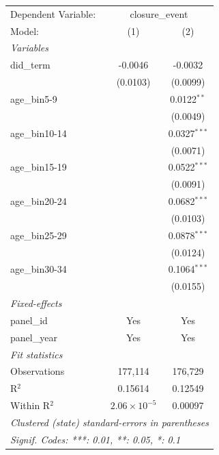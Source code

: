
\begingroup
\centering
\begin{tabular}{lcc}
   \tabularnewline \midrule \midrule
   Dependent Variable: & \multicolumn{2}{c}{closure\_event}\\
   Model:         & (1)                   & (2)\\  
   \midrule
   \emph{Variables}\\
   did\_term      & -0.0046               & -0.0032\\   
                  & (0.0103)              & (0.0099)\\   
   age\_bin5-9    &                       & 0.0122$^{**}$\\   
                  &                       & (0.0049)\\   
   age\_bin10-14  &                       & 0.0327$^{***}$\\   
                  &                       & (0.0071)\\   
   age\_bin15-19  &                       & 0.0522$^{***}$\\   
                  &                       & (0.0091)\\   
   age\_bin20-24  &                       & 0.0682$^{***}$\\   
                  &                       & (0.0103)\\   
   age\_bin25-29  &                       & 0.0878$^{***}$\\   
                  &                       & (0.0124)\\   
   age\_bin30-34  &                       & 0.1064$^{***}$\\   
                  &                       & (0.0155)\\   
   \midrule
   \emph{Fixed-effects}\\
   panel\_id      & Yes                   & Yes\\  
   panel\_year    & Yes                   & Yes\\  
   \midrule
   \emph{Fit statistics}\\
   Observations   & 177,114               & 176,729\\  
   R$^2$          & 0.15614               & 0.12549\\  
   Within R$^2$   & $2.06\times 10^{-5}$  & 0.00097\\  
   \midrule \midrule
   \multicolumn{3}{l}{\emph{Clustered (state) standard-errors in parentheses}}\\
   \multicolumn{3}{l}{\emph{Signif. Codes: ***: 0.01, **: 0.05, *: 0.1}}\\
\end{tabular}
\par\endgroup


